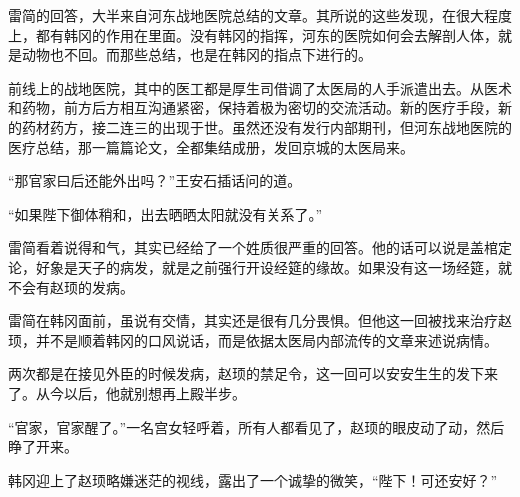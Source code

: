 雷简的回答，大半来自河东战地医院总结的文章。其所说的这些发现，在很大程度上，都有韩冈的作用在里面。没有韩冈的指挥，河东的医院如何会去解剖人体，就是动物也不回。而那些总结，也是在韩冈的指点下进行的。

前线上的战地医院，其中的医工都是厚生司借调了太医局的人手派遣出去。从医术和药物，前方后方相互沟通紧密，保持着极为密切的交流活动。新的医疗手段，新的药材药方，接二连三的出现于世。虽然还没有发行内部期刊，但河东战地医院的医疗总结，那一篇篇论文，全都集结成册，发回京城的太医局来。

“那官家曰后还能外出吗？”王安石插话问的道。

“如果陛下御体稍和，出去晒晒太阳就没有关系了。”

雷简看着说得和气，其实已经给了一个姓质很严重的回答。他的话可以说是盖棺定论，好象是天子的病发，就是之前强行开设经筵的缘故。如果没有这一场经筵，就不会有赵顼的发病。

雷简在韩冈面前，虽说有交情，其实还是很有几分畏惧。但他这一回被找来治疗赵顼，并不是顺着韩冈的口风说话，而是依据太医局内部流传的文章来述说病情。

两次都是在接见外臣的时候发病，赵顼的禁足令，这一回可以安安生生的发下来了。从今以后，他就别想再上殿半步。

“官家，官家醒了。”一名宫女轻呼着，所有人都看见了，赵顼的眼皮动了动，然后睁了开来。

韩冈迎上了赵顼略嫌迷茫的视线，露出了一个诚挚的微笑，“陛下！可还安好？”

